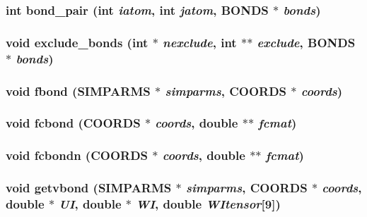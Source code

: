 \subsubsection{\setlength{\rightskip}{0pt plus 5cm}int bond\_\-pair (int {\em iatom}, int {\em jatom}, {\bf BONDS} $\ast$ {\em bonds})}\label{md__fbond_8c_f239d85f3caf16dfb42bcdd2789aef0a}


\subsubsection{\setlength{\rightskip}{0pt plus 5cm}void exclude\_\-bonds (int $\ast$ {\em nexclude}, int $\ast$$\ast$ {\em exclude}, {\bf BONDS} $\ast$ {\em bonds})}\label{md__fbond_8c_bee04cc7df43aab96f8247885bee1491}


\subsubsection{\setlength{\rightskip}{0pt plus 5cm}void fbond ({\bf SIMPARMS} $\ast$ {\em simparms}, {\bf COORDS} $\ast$ {\em coords})}\label{md__fbond_8c_053864c7d431609524ae5fc8a3d519fb}


\subsubsection{\setlength{\rightskip}{0pt plus 5cm}void fcbond ({\bf COORDS} $\ast$ {\em coords}, double $\ast$$\ast$ {\em fcmat})}\label{md__fbond_8c_c9571900cc68d3003407eedbedf637aa}


\subsubsection{\setlength{\rightskip}{0pt plus 5cm}void fcbondn ({\bf COORDS} $\ast$ {\em coords}, double $\ast$$\ast$ {\em fcmat})}\label{md__fbond_8c_da9142c3636a22727016ddc34fc3803f}


\subsubsection{\setlength{\rightskip}{0pt plus 5cm}void getvbond ({\bf SIMPARMS} $\ast$ {\em simparms}, {\bf COORDS} $\ast$ {\em coords}, double $\ast$ {\em UI}, double $\ast$ {\em WI}, double {\em WItensor}[9])}\label{md__fbond_8c_08b1adfb2e1851b99aeb065aa85629d3}


